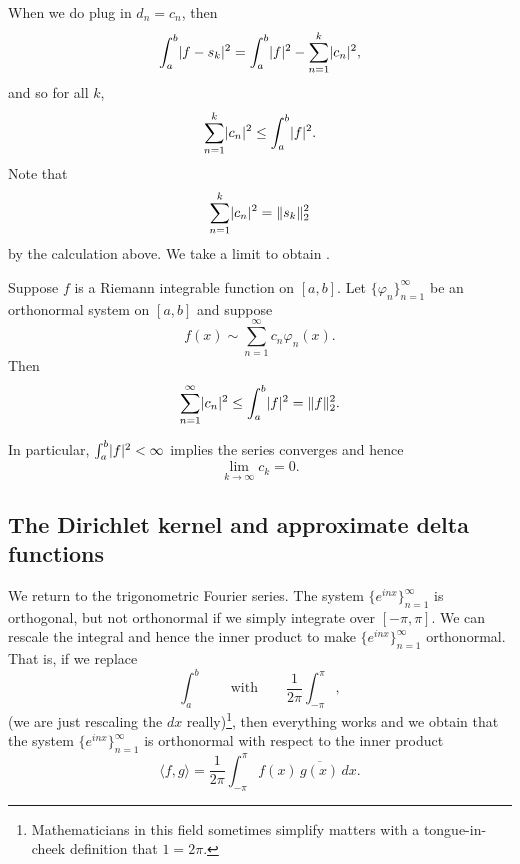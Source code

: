 When we do plug in $d_n = c_n$, then
\begin{equation*}
\int_a^b \lvert {f-s_k} \rvert^2
=
\int_a^b \lvert {f} \rvert^2
-
\sum_{n=1}^k \lvert {c_n} \rvert^2 ,
\end{equation*}
and so for all $k$,
\begin{equation*}
\sum_{n=1}^k \lvert {c_n} \rvert^2
\leq
\int_a^b \lvert {f} \rvert^2 .
\end{equation*}
Note that
\begin{equation*}
\sum_{n=1}^k \lvert {c_n} \rvert^2 = \lVert {s_k} \rVert_2^2
\end{equation*}
by the calculation above.
We take a limit to obtain
\emph{}.

\begin{thm} \label{thm:bessels}
Suppose $f$ is a Riemann integrable function on $[a,b]$.
Let $\{ \varphi_n \}_{n=1}^\infty$ be an orthonormal system on $[a,b]$ and
suppose
\begin{equation*}
f(x) \sim \sum_{n=1}^\infty c_n \varphi_n(x) .
\end{equation*}
Then
\begin{equation*}
\sum_{n=1}^\infty \lvert {c_n} \rvert^2
\leq
\int_a^b \lvert {f} \rvert^2
= \lVert {f} \rVert_2^2 .
\end{equation*}
\end{thm}

In particular, $\int_a^b \lvert {f} \rvert^2 < \infty$ implies the series
converges and hence
\begin{equation*}
\lim_{k \to \infty} c_k = 0 .
\end{equation*}

\subsection{The Dirichlet kernel and approximate delta functions}

We return to the trigonometric Fourier series.
The system $\{ e^{inx} \}_{n=1}^\infty$ is orthogonal, but not orthonormal if we simply
integrate over $[-\pi,\pi]$.  We can rescale the integral
and hence the inner product to make 
$\{ e^{inx} \}_{n=1}^\infty$ orthonormal.  That is, if we replace
\begin{equation*}
\int_a^b \qquad \text{with} \qquad
\frac{1}{2\pi} \int_{-\pi}^\pi,
\end{equation*}
(we are just rescaling the $dx$ really)\footnote{%
Mathematicians in this field sometimes simplify matters with
a tongue-in-cheek definition that $1=2\pi$.},
then everything works and we obtain that the system
$\{ e^{inx} \}_{n=1}^\infty$
is orthonormal with respect to the inner product
\begin{equation*}
\langle f , g \rangle =
\frac{1}{2\pi} \int_{-\pi}^\pi f(x) \, \overline{g(x)} \, dx .
\end{equation*}

